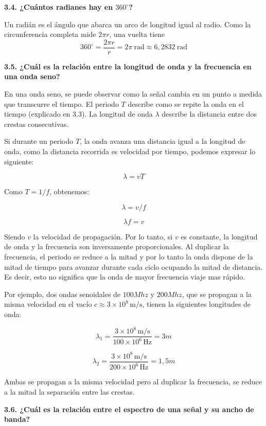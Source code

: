 \documentclass[11pt,a4paper]{article}
\begin{document}
\vspace{0.3cm}
\noindent\textbf{3.4. ¿Cuántos radianes hay en $360^\circ$?}\par
Un radián es el ángulo que abarca un arco de longitud igual al radio. Como la circunferencia completa mide $2\pi r$, una vuelta tiene
\[
  360^\circ = \frac{2\pi r}{r} = 2\pi~\text{rad} \approx 6{,}2832~\text{rad}
\]

\vspace{0.3cm}
\noindent\textbf{3.5. ¿Cuál es la relación entre la longitud de onda y la frecuencia en una onda seno?}\par
En una onda seno, se puede observar como la señal cambia en un punto a medida que transcurre el tiempo. El periodo $T$ describe como se repite la onda en el tiempo (explicado en 3.3). La longitud de onda $\lambda$ describe la distancia entre dos crestas consecutivas.

Si durante un periodo $T$, la onda avanza una distancia igual a la longitud de onda, como la distancia recorrida es velocidad por tiempo, podemos expresar lo siguiente:

$$\lambda=vT$$

Como $T=1/f$, obtenemos:

$$\lambda=v/f$$

$$\lambda f=v$$

Siendo $v$ la velocidad de propagación. Por lo tanto, si $v$ es constante, la longitud de onda y la frecuencia son inversamente proporcionales. Al duplicar la frecuencia, el periodo se reduce a la mitad y por lo tanto la onda dispone de la mitad de tiempo para avanzar durante cada ciclo ocupando la mitad de distancia. Es decir, esto no significa que la onda de mayor frecuencia viaje mas rápido. 

Por ejemplo, dos ondas senoidales de $100Mhz$ y $200Mhz$, que se propagan a la misma velocidad en el vacío $c\approx3\times10^8\,\mathrm{m/s}$, tienen la siguientes longitudes de onda:

$$
\lambda_1=\frac{3\times10^8\,\mathrm{m/s}}{100\times10^6\,\mathrm{Hz}}=3m
$$

$$
\lambda_2=\frac{3\times10^8\,\mathrm{m/s}}{200\times10^6\,\mathrm{Hz}}=1,5m
$$

Ambas se propagan a la misma velocidad pero al duplicar la frecuencia, se reduce a la mitad la separación entre las crestas.

\vspace{0.3cm}
\noindent\textbf{3.6. ¿Cuál es la relación entre el espectro de una señal y su ancho de banda?}
\end{document}
